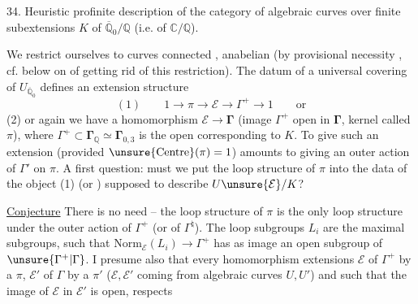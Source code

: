 34. Heuristic profinite description of the category
of algebraic curves  over  finite
subextensions $K$ of $\overline{\mathbb Q}_0/\mathbb Q$ (i.e. of $\mathbb C/\mathbb Q$).

We restrict ourselves to curves  connected , anabelian
(by provisional necessity \unsure{!}, cf. below on  of
getting rid of this restriction). The datum of
a universal covering of  $U_{\overline{\mathbb Q}_0}$ defines an
extension structure
\[
(1)\qquad 1\longrightarrow\pi\longrightarrow\mathcal E\longrightarrow\Gamma^{+}\longrightarrow1\qquad\text{or}
\]
(2) or again we have a homomorphism $\mathcal E\longrightarrow\boldsymbol{\Gamma}$
(image $\Gamma^{+}$ open in $\boldsymbol{\Gamma}$,
kernel called $\pi$),
where $\Gamma^{+}\subset\boldsymbol{\Gamma}_{\mathbb Q}\simeq\boldsymbol{\Gamma}_{0,3}$ is the open 
corresponding to $K$. To give such an
extension (provided $\unsure{\mathrm{Centre}}(\pi)=1$) amounts to
giving an outer action of $\Gamma'$ on $\pi$.
A first question: must we put the
loop structure of $\pi$ into the  data  of
the object (1) (or ) supposed to describe $U\unsure{\mathcal E}/K$?

\uline{Conjecture} There is no need -- the loop structure
of $\pi$ is the only loop structure 
under the outer action of $\Gamma^{+}$ (or of $\Gamma^{\natural}$). The
loop subgroups $L_i$ are the maximal
subgroups, such that $\mathrm{Norm}_{\mathcal E}(L_i)\longrightarrow\Gamma^{+}$ has
as image an open subgroup of $\unsure{\Gamma^{+}|\Gamma}$.
I
presume also that every homomorphism  extensions
$\mathcal E$ of $\Gamma^{+}$ by a $\pi$, $\mathcal E'$ of $\Gamma$ by a $\pi'$
($\mathcal E,\mathcal E'$ coming from algebraic curves $U,U'$) and such
that the image of $\mathcal E$ in $\mathcal E'$ is open, respects
